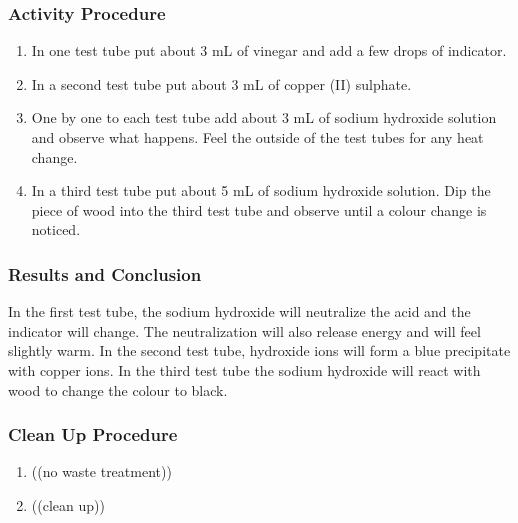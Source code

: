 \subsubsection*{Activity Procedure}
\begin{enumerate}
\item{In one test tube put about 3 mL of vinegar and add a few drops of indicator.}
\item{In a second test tube put about 3 mL of copper (II) sulphate.}
\item{One by one to each test tube add about 3 mL of sodium hydroxide solution and observe what happens. Feel the outside of the test tubes for any heat change.}
\item{In a third test tube put about 5 mL of sodium hydroxide solution. Dip the piece of wood into the third test tube and observe until a colour change is noticed.}
\end{enumerate}

\subsubsection*{Results and Conclusion}
In the first test tube, the sodium hydroxide will neutralize the acid and the indicator will change. The neutralization will also release energy and will feel slightly warm.
In the second test tube, hydroxide ions will form a blue precipitate with copper ions.
In the third test tube the sodium hydroxide will react with wood to change the colour to black.

\subsubsection*{Clean Up Procedure}
\begin{enumerate}
\item{((no waste treatment))}
\item{((clean up))}
\end{enumerate}
